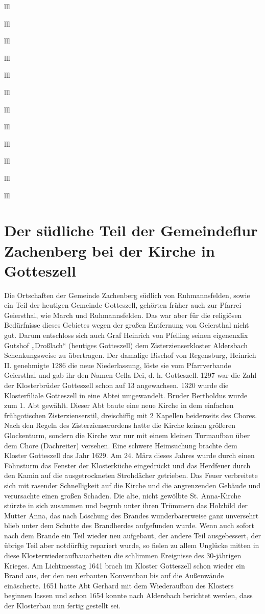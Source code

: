 \documentclass[12pt,a4pager]{book}
\begin{document}
\begin{tabuluar}{lll}
\begin{tabuluar}{lll}
\begin{tabuluar}{lll}
\begin{tabuluar}{lll}
\begin{tabuluar}{lll}
\begin{tabuluar}{lll}
\begin{tabuluar}{lll}
\begin{tabuluar}{lll}
\begin{tabuluar}{lll}
\begin{tabuluar}{lll}
\begin{tabuluar}{lll}
\begin{tabuluar}{lll}
\section{Der südliche Teil der Gemeindeflur Zachenberg bei der Kirche in
Gotteszell}

Die Ortschaften der Gemeinde Zachenberg südlich von Ruhmannsfelden, sowie ein
Teil der heutigen Gemeinde Gotteszell, gehörten früher auch zur Pfarrei
Geiersthal, wie March und Ruhmannsfelden. Das war aber für die religiösen
Bedürfnisse dieses Gebietes wegen der großen Entfernung von Geiersthal nicht
gut. Darum entschloss sich auch Graf Heinrich von Pfelling seinen eigenenxlix
Gutshof „Droßlach“ (heutiges Gotteszell) dem Zisterzienserkloster Aldersbach
Schenkungsweise zu übertragen. Der damalige Bischof von Regensburg, Heinrich II.
genehmigte 1286 die neue Niederlassung, löste sie vom Pfarrverbande Geiersthal
und gab ihr den Namen Cella Dei, d. h. Gotteszell. 1297 war die Zahl der
Klosterbrüder Gotteszell schon auf 13 angewachsen. 1320 wurde die Klosterfiliale
Gotteszell in eine Abtei umgewandelt. Bruder Bertholdus wurde zum 1. Abt
gewählt. Dieser Abt baute eine neue Kirche in dem einfachen frühgotischen
Zisterzienserstil, dreischiffig mit 2 Kapellen beiderseits des Chores. Nach den
Regeln des Zisterzienserordens hatte die Kirche keinen größeren Glockenturm,
sondern die Kirche war nur mit einem kleinen Turmaufbau über dem Chore
(Dachreiter) versehen. Eine schwere Heimsuchung brachte dem Kloster Gotteszell
das Jahr 1629. Am 24. März dieses Jahres wurde durch einen Föhnsturm das Fenster
der Klosterküche eingedrückt und das Herdfeuer durch den Kamin auf die
ausgetrockneten Strohdächer getrieben. Das Feuer verbreitete sich mit rasender
Schnelligkeit auf die Kirche und die angrenzenden Gebäude und verursachte einen
großen Schaden. Die alte, nicht gewölbte St. Anna-Kirche stürzte in sich
zusammen und begrub unter ihren Trümmern das Holzbild der Mutter Anna, das nach
Löschung des Brandes wunderbarerweise ganz unversehrt blieb unter dem Schutte
des Brandherdes aufgefunden wurde. Wenn auch sofort nach dem Brande ein Teil
wieder neu aufgebaut, der andere Teil ausgebessert, der übrige Teil aber
notdürftig repariert wurde, so fielen zu allem Unglücke mitten in diese
Klosterwiederaufbauarbeiten die schlimmen Ereignisse des 30-jährigen Krieges. Am
Lichtmesstag 1641 brach im Kloster Gotteszell schon wieder ein Brand aus, der
den neu erbauten Konventbau bis auf die Außenwände einäscherte. 1651 hatte Abt
Gerhard mit dem Wiederaufbau des Klosters beginnen lassen und schon 1654 konnte
nach Aldersbach berichtet werden, dass der Klosterbau nun fertig gestellt sei.

\end{tabuluar}
\end{tabuluar}
\end{tabuluar}
\end{tabuluar}
\end{tabuluar}
\end{tabuluar}
\end{tabuluar}
\end{tabuluar}
\end{tabuluar}
\end{tabuluar}
\end{tabuluar}
\end{tabuluar}
\end{document}
